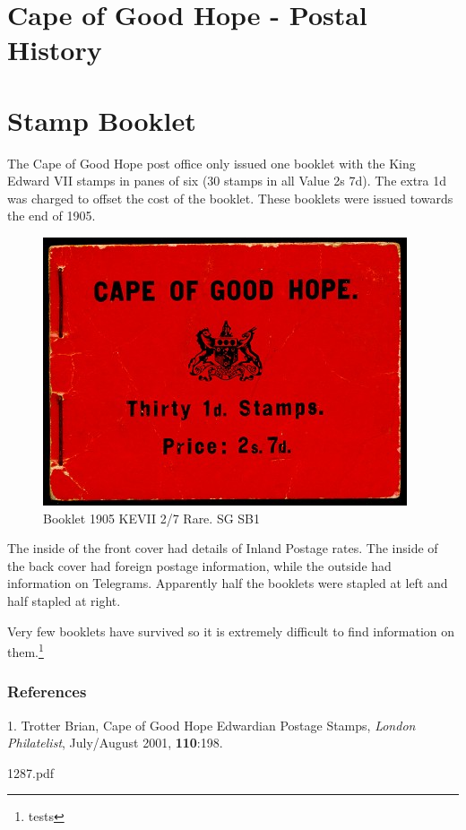\section{Cape of Good Hope - Postal History } 
\section{Stamp Booklet}
The Cape of Good Hope post office only issued one booklet with the King Edward VII stamps in panes of six (30 stamps in all Value 2s 7d). The extra 1d was charged to offset the cost of the booklet. These booklets were issued towards the end of 1905.

\begin{figure}[htbp]
\centering
\includegraphics[width=.60\textwidth]{../cape-of-good-hope/stamp-booklet.jpg} 
\caption{Booklet 1905 KEVII 2/7 Rare. SG SB1}
\end{figure}

The inside of the front cover had details of Inland Postage rates. The inside of the back cover had foreign postage information, while the outside had information on
Telegrams. Apparently half the booklets were stapled at left and half stapled at right.

Very few booklets have survived so it is extremely difficult to find information on them.\footnote[]{tests}

\subsubsection{References}
1. Trotter Brian, Cape of Good Hope Edwardian Postage Stamps, \textit{London Philatelist}, July/August 2001, \textbf{110}:198.





1287.pdf



	 
                                    